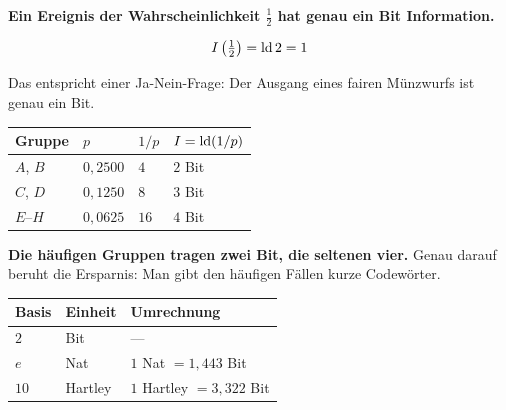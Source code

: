 \begin{merksatz}
\begin{center}
\begin{minipage}{0.9\textwidth}
\textbf{Ein Ereignis der Wahrscheinlichkeit $\frac12$ hat genau ein Bit Information.}
\end{minipage}
\end{center}

\[ I\left(\tfrac12\right) = \operatorname{ld} 2 = 1 \]

Das entspricht einer Ja-Nein-Frage: Der Ausgang eines fairen Münzwurfs ist genau ein Bit.

\begin{center}
{\small
\renewcommand{\arraystretch}{1.48}
\begin{tabular}{@{}P{1.8cm}P{1.8cm}P{2.2cm}P{2.0cm}@{}}
\toprule
\textbf{Gruppe} & $p$ & $1/p$ & $I = \operatorname{ld}(1/p)$\\
\midrule
$A$, $B$ & $0{,}2500$ & $4$ & $2$ Bit\\
$C$, $D$ & $0{,}1250$ & $8$ & $3$ Bit\\
$E$--$H$ & $0{,}0625$ & $16$ & $4$ Bit\\
\bottomrule
\end{tabular}}
\end{center}

\begin{center}
\begin{minipage}{0.9\textwidth}
\textbf{Die häufigen Gruppen tragen zwei Bit, die seltenen vier.} Genau darauf beruht die Ersparnis: Man gibt den häufigen Fällen kurze Codewörter.
\end{minipage}
\end{center}

\begin{center}
\renewcommand{\arraystretch}{1.5}
\begin{tabular}{@{}P{2.0cm}P{2.4cm}P{3.0cm}@{}}
\toprule
\textbf{Basis} & \textbf{Einheit} & \textbf{Umrechnung}\\
\midrule
$2$ & Bit & ---\\
$e$ & Nat & $1$ Nat $= 1{,}443$ Bit\\
$10$ & Hartley & $1$ Hartley $= 3{,}322$ Bit\\
\bottomrule
\end{tabular}
\end{center}

\begin{center}
\begin{minipage}{0.88\textwidth}
\end{minipage}
\end{center}
\end{merksatz}

